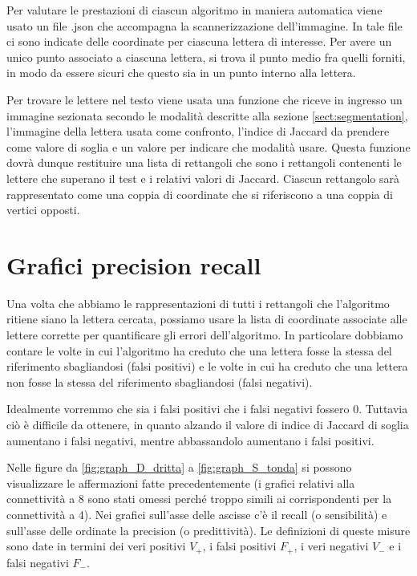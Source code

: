 Per valutare le prestazioni di ciascun algoritmo in maniera automatica viene usato un file .json che accompagna la scannerizzazione dell'immagine. In tale file ci sono indicate delle coordinate per ciascuna lettera di interesse. Per avere un unico punto associato a ciascuna lettera, si trova il punto medio fra quelli forniti, in modo da essere sicuri che questo sia in un punto interno alla lettera.

Per trovare le lettere nel testo viene usata una funzione che riceve in ingresso un immagine sezionata secondo le modalit\`a descritte alla sezione \ref{sect:segmentation}, l'immagine della lettera usata come confronto, l'indice di Jaccard da prendere come valore di soglia e un valore per indicare che modalit\`a usare. Questa funzione dovr\`a dunque restituire una lista di rettangoli che sono i rettangoli contenenti le lettere che superano il test e i relativi valori di Jaccard. Ciascun rettangolo sar\`a rappresentato come una coppia di coordinate che si riferiscono a una coppia di vertici opposti.

\section{Grafici precision recall}

Una volta che abbiamo le rappresentazioni di tutti i rettangoli che l'algoritmo ritiene siano la lettera cercata, possiamo usare la lista di coordinate associate alle lettere corrette per quantificare gli errori dell'algoritmo. In particolare dobbiamo contare le volte in cui l'algoritmo ha creduto che una lettera fosse la stessa del riferimento sbagliandosi (falsi positivi) e le volte in cui ha creduto che una lettera non fosse la stessa del riferimento sbagliandosi (falsi negativi).

Idealmente vorremmo che sia i falsi positivi che i falsi negativi fossero 0. Tuttavia ci\`o \`e difficile da ottenere, in quanto alzando il valore di indice di Jaccard di soglia aumentano i falsi negativi, mentre abbassandolo aumentano i falsi positivi.

Nelle figure da \ref{fig:graph_D_dritta} a \ref{fig:graph_S_tonda} si possono visualizzare le affermazioni fatte precedentemente (i grafici relativi alla connettivit\`a a 8 sono stati omessi perch\'e troppo simili ai corrispondenti per la connettivit\`a a 4). Nei grafici sull'asse delle ascisse c'\`e il recall (o sensibilit\`a) e sull'asse delle ordinate la precision (o predittivit\`a). Le definizioni di queste misure sono date in termini dei veri positivi $V_+$, i falsi positivi $F_+$, i veri negativi $V_-$ e i falsi negativi $F_-$.

